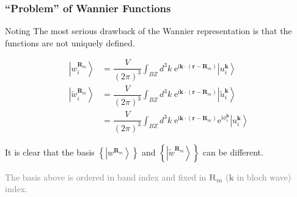 \documentclass{beamer}
\begin{document}
  \begin{frame}
  \frametitle{``Problem'' of Wannier Functions}

  \begin{block}{Noting}
    The most serious drawback of the Wannier representation is that the functions are not uniquely defined. 
  \end{block}

  \begin{equation*}
    \begin{aligned}
      \left|w_i^{\mathbf{R}_m}\right\rangle &= \dfrac{V}{(2\pi)^3}\int_{BZ}d^3k\;\mathrm{e}^{\mathrm{i}\mathbf{k}\cdot(\mathbf{r}-\mathbf{R}_m)}\left|u_i^{\mathbf{k}}\right\rangle\\
      \left|\tilde{w}_i^{\mathbf{R}_m}\right\rangle &= \dfrac{V}{(2\pi)^3}\int_{BZ}d^3k\;\mathrm{e}^{\mathrm{i}\mathbf{k}\cdot(\mathbf{r}-\mathbf{R}_m)}\left|\tilde{u}_i^{\mathbf{k}}\right\rangle\\
      &= \dfrac{V}{(2\pi)^3}\int_{BZ}d^3k\;\mathrm{e}^{\mathrm{i}\mathbf{k}\cdot(\mathbf{r}-\mathbf{R}_m)}\mathrm{e}^{\mathrm{i}\phi_i^{\mathbf{k}}}\left|u_i^{\mathbf{k}}\right\rangle
    \end{aligned}
  \end{equation*}

  It is clear that the basis \(\left\{\left|w^{\mathbf{R}_m}\right\rangle\right\}\) and \(\left\{\left|\tilde{w}^{\mathbf{R}_m}\right\rangle\right\}\) can be different.

    \textcolor{gray}{The basis above is ordered in band index and fixed in \(\mathbf{R_m}\) (\(\mathbf{k}\) in bloch wave) index.}
  \end{frame}
\end{document}
